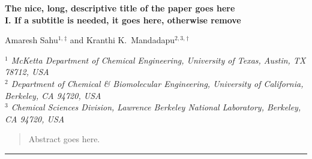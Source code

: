 \documentclass[11pt,twoside,notitlepage]{article}
\begin{document}

	\begin{center}
		{\textbf{
			\Large{The nice, long, descriptive title of the paper goes here}
		}} \\
		\vspace{0.11in}
		{\textbf{
			\large{I. If a subtitle is needed, it goes here, otherwise remove}
		}} \\
		\vspace{0.21in}

		{\small
			Amaresh Sahu$^{1,}$\hyperlink{email1}{$^{\ddag}$}
			and Kranthi K.\ Mandadapu$^{2,3,}$\hyperlink{email2}{$^{\dag}$} \\
		}
		\vspace{0.25in}

		{\footnotesize
			\textit{$^1$%
			McKetta Department of Chemical Engineering,
			University of Texas, Austin, TX 78712, USA}
			\\[2pt]
			\textit{$^2$%
			Department of Chemical \& Biomolecular Engineering,
			University of California, Berkeley, CA 94720, USA}
			\\[2pt]
			\textit{$^3$%
			Chemical Sciences Division,
			Lawrence Berkeley National Laboratory, Berkeley, CA 94720, USA}
			\\
		}
	\end{center}



	\vspace{13pt}

	\begin{abstract}
		Abstract goes here.
		\lipsum[1]
	\end{abstract}
	\vspace{15pt}
				   



	\noindent\rule{4.6cm}{0.4pt}

	\small



	\normalsize
	\vspace{25pt}
\end{document}
